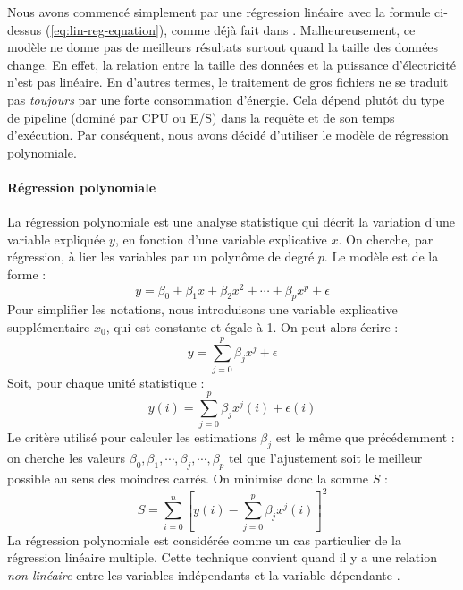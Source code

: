 Nous avons commencé simplement par une régression linéaire avec la formule ci-dessus (\ref{eq:lin-reg-equation}), comme déjà fait dans \cite{Xu13, Kunjir12, Lang11}. Malheureusement, ce modèle ne donne pas de meilleurs résultats surtout quand la taille des données change. En effet, la relation entre la taille des données et la puissance d'électricité n'est pas linéaire. En d'autres termes, le traitement de gros fichiers ne se traduit pas \textit{toujours} par une forte consommation d'énergie. Cela dépend plutôt du type de pipeline (dominé par CPU ou E/S) dans la requête et de son temps d'exécution. Par conséquent, nous avons décidé d'utiliser le modèle de régression polynomiale.

\paragraph{Régression polynomiale}
La régression polynomiale est une analyse statistique qui décrit la variation d'une variable expliquée $y$, en fonction d'une variable explicative $x$. On cherche, par régression, à lier les variables par un polynôme de degré $p$. Le modèle est de la forme \cite{Kutner04} :
\begin{equation}
y = \beta_0 + \beta_1 x + \beta_2 x^2 + \cdots + \beta_p x^p + \epsilon
\end{equation}
Pour simplifier les notations, nous introduisons une variable explicative supplémentaire $x_0$, qui est constante et égale à 1. On peut alors écrire :
\begin{equation}
y = \sum_{j=0}^{p} \beta_j x^j + \epsilon
\end{equation}
Soit, pour chaque unité statistique :
\begin{equation}
y(i) = \sum_{j=0}^{p} \beta_j x^j(i) + \epsilon(i)
\end{equation}
Le critère utilisé pour calculer les estimations $\beta_j$ est le même que précédemment : on cherche les valeurs $\beta_0, \beta_1, \cdots, \beta_j, \cdots, \beta_p$ tel que l'ajustement soit le meilleur possible au sens des moindres carrés. On minimise donc la somme $S$ :
\begin{equation}
S = \sum_{i=0}^{n} [ y(i) - \sum_{j=0}^{p} \beta_j x^j(i) ]^2
\end{equation}
La régression polynomiale est considérée comme un cas particulier de la régression linéaire multiple. Cette technique convient quand il y a une relation \textit{non linéaire} entre les variables indépendants et la variable dépendante \cite{Neter96}.

